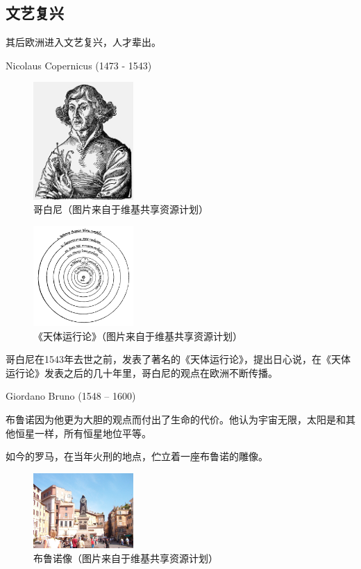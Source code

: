 \documentclass[a4paper,10.5pt]{article}
\begin{document}
\newpage

\subsection{文艺复兴}

其后欧洲进入文艺复兴，人才辈出。

Nicolaus Copernicus (1473 - 1543)

\begin{figure}[ht]
\centering
\includegraphics[width=1.5in]{images/1_05-Mikolaj_Kopernik.jpg}
\caption{哥白尼（图片来自于维基共享资源计划）}
\end{figure}

\begin{figure}[ht]
\centering
\includegraphics[width=1.5in]{images/1_06-Copernican_heliocentrism_theory_diagram.png}
\caption{《天体运行论》（图片来自于维基共享资源计划）}
\end{figure}

哥白尼在1543年去世之前，发表了著名的《天体运行论》，提出日心说，在《天体运行论》发表之后的几十年里，哥白尼的观点在欧洲不断传播。

Giordano Bruno (1548 – 1600)

布鲁诺因为他更为大胆的观点而付出了生命的代价。他认为宇宙无限，太阳是和其他恒星一样，所有恒星地位平等。

如今的罗马，在当年火刑的地点，伫立着一座布鲁诺的雕像。

\begin{figure}[ht]
\centering
\includegraphics[width=1.5in]{images/1_07-Brunostatue.jpg}
\caption{布鲁诺像（图片来自于维基共享资源计划）}
\end{figure}
\end{document}
